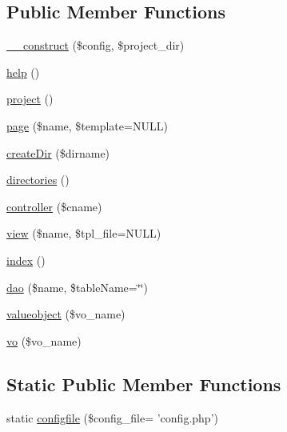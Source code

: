 \subsection*{Public Member Functions}
\begin{DoxyCompactItemize}
\item 
\hyperlink{class_sec_plus_1_1_create_command_a9147b452afc1ea079f6dc5c9da834307}{\_\-\_\-construct} (\$config, \$project\_\-dir)
\item 
\hyperlink{class_sec_plus_1_1_create_command_a91482c4db18186b33acbaf1528a50ddc}{help} ()
\item 
\hyperlink{class_sec_plus_1_1_create_command_ac1f3814edaf5a29fd3a89bca85770e0f}{project} ()
\item 
\hyperlink{class_sec_plus_1_1_create_command_adbece001d3c0007a273f36b558429bb0}{page} (\$name, \$template=NULL)
\item 
\hyperlink{class_sec_plus_1_1_create_command_ac2c21d89b15f1eee71db586f0fa46143}{createDir} (\$dirname)
\item 
\hyperlink{class_sec_plus_1_1_create_command_a6a09508d66a3bd88fa5bde5b157bf13e}{directories} ()
\item 
\hyperlink{class_sec_plus_1_1_create_command_aeee32c16aa802d9db2b7abbe6feb16b4}{controller} (\$cname)
\item 
\hyperlink{class_sec_plus_1_1_create_command_a010c805861621ee87d8b95737a42a6c5}{view} (\$name, \$tpl\_\-file=NULL)
\item 
\hyperlink{class_sec_plus_1_1_create_command_a149eb92716c1084a935e04a8d95f7347}{index} ()
\item 
\hyperlink{class_sec_plus_1_1_create_command_a66791b95523a6f41ae9847d6a1ff5cee}{dao} (\$name, \$tableName=\char`\"{}\char`\"{})
\item 
\hyperlink{class_sec_plus_1_1_create_command_aa311520cb1317f7ebec57bb59366b385}{valueobject} (\$vo\_\-name)
\item 
\hyperlink{class_sec_plus_1_1_create_command_a7627fda489c1ddf2fa0d594607dc058f}{vo} (\$vo\_\-name)
\end{DoxyCompactItemize}
\subsection*{Static Public Member Functions}
\begin{DoxyCompactItemize}
\item 
static \hyperlink{class_sec_plus_1_1_create_command_a85efae42db767b340ce4564b48733a49}{configfile} (\$config\_\-file= 'config.php')
\end{DoxyCompactItemize}
